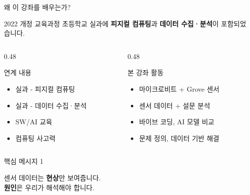 \documentclass[aspectratio=169, 11pt]{beamer}
\begin{document}
\begin{frame}{왜 이 강좌를 배우는가?}
\begin{alertblock}{2022 개정 교육과정}
초등학교 실과에 \textbf{피지컬 컴퓨팅}과 \textbf{데이터 수집·분석}이 포함되었습니다.
\end{alertblock}

\vspace{0.5em}

\begin{columns}[T, totalwidth=\textwidth]
\begin{column}{0.48\textwidth}
\begin{exampleblock}{연계 내용}
\begin{itemize}
    \item 실과 - 피지컬 컴퓨팅
    \item 실과 - 데이터 수집·분석
    \item SW/AI 교육
    \item 컴퓨팅 사고력
\end{itemize}
\end{exampleblock}
\end{column}
\hfill
\begin{column}{0.48\textwidth}
\begin{exampleblock}{본 강좌 활동}
\begin{itemize}
    \item 마이크로비트 + Grove 센서
    \item 센서 데이터 + 설문 분석
    \item 바이브 코딩, AI 모델 비교
    \item 문제 정의, 데이터 기반 해결
\end{itemize}
\end{exampleblock}
\end{column}
\end{columns}
\end{frame}

\begin{frame}{핵심 메시지 1}
\begin{center}
\vspace{1cm}
\vspace{1cm}

{\large 센서 데이터는 \textbf{현상}만 보여줍니다.\\[0.3em]
\textbf{원인}은 우리가 해석해야 합니다.}
\end{center}
\end{frame}
\end{document}
